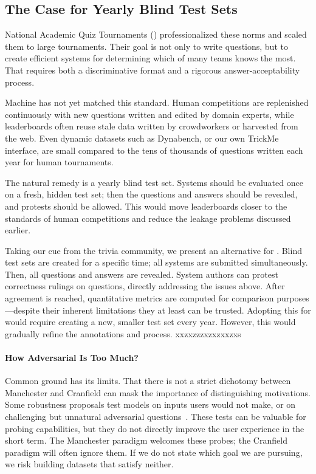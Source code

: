 

\subsection{The Case for Yearly Blind Test Sets}
\label{sec:manchester:qb-blind}

National Academic Quiz Tournaments () professionalized these norms
and scaled them to large tournaments. Their goal is not only to write
questions, but to create efficient systems for determining which of many teams
knows the most. That requires both a discriminative format and a rigorous
answer-acceptability process.

Machine  has not yet matched this standard. Human competitions are
replenished continuously with new questions written and edited by domain
experts, while  leaderboards often reuse stale data written by
crowdworkers or harvested from the web. Even dynamic datasets such as
Dynabench, or our own TrickMe interface, are small compared to the tens of
thousands of questions written each year for human tournaments.

The natural remedy is a yearly blind test set. Systems should be evaluated once
on a fresh, hidden test set; then the questions and answers should be revealed,
and protests should be allowed. This would move  leaderboards closer to
the standards of human competitions and reduce the leakage problems discussed
earlier.



Taking our cue from the trivia community, we present an alternative
for .
Blind test sets are created for a specific time; all systems are submitted simultaneously.
Then, all questions and answers are revealed.
System authors can protest correctness rulings on questions, directly
addressing the issues above. 
After agreement is reached,
quantitative metrics are computed for comparison purposes---despite their inherent limitations they at least can be
trusted.
Adopting this for  would require creating a new, smaller test
set every year.
However, this would gradually refine the annotations and process. xxzxzzzxzxzxxzxs 



\paragraph{How Adversarial Is Too Much?}
%
Common ground has its limits. That there is not a strict dichotomy between
Manchester and Cranfield can mask the importance of distinguishing motivations.
Some robustness proposals test models on inputs users would not make, or on
challenging but unnatural adversarial questions~\citep{Feng-18,jia2017adversarial,wallace-19,bartolo2020beat,kiela2021dynabench}.
These tests can be valuable for probing capabilities, but they do not directly
improve the user experience in the short term. The Manchester paradigm
welcomes these probes; the Cranfield paradigm will often ignore them. If we do
not state which goal we are pursuing, we risk building datasets that satisfy
neither.

